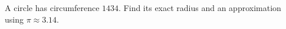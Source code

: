 A circle has circumference $1434$. Find its exact radius and an approximation using $\pi\approx3.14$.
